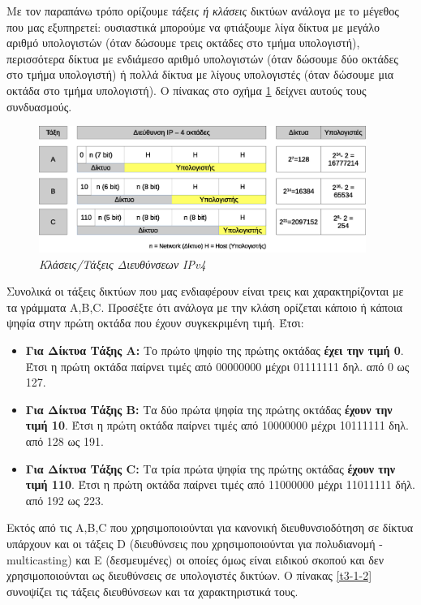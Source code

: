 Με τον παραπάνω τρόπο ορίζουμε \emph{τάξεις ή κλάσεις} δικτύων ανάλογα με το μέγεθος που μας εξυπηρετεί: ουσιαστικά μπορούμε να φτιάξουμε λίγα δίκτυα με μεγάλο αριθμό υπολογιστών (όταν δώσουμε τρεις οκτάδες στο τμήμα υπολογιστή), περισσότερα δίκτυα με ενδιάμεσο αριθμό υπολογιστών (όταν δώσουμε δύο οκτάδες στο τμήμα υπολογιστή) ή πολλά δίκτυα με λίγους υπολογιστές (όταν δώσουμε μια οκτάδα στο τμήμα υπολογιστή). Ο πίνακας στο σχήμα \ref{3-2} δείχνει αυτούς τους συνδυασμούς.

\begin{figure}[!ht]
  \centering
  \includegraphics[width=0.95\textwidth]{images/chapter3/3-3}
  \caption {\textsl{Κλάσεις/Τάξεις Διευθύνσεων IPv4}}
  \label{3-2}
\end{figure}

Συνολικά οι τάξεις δικτύων που μας ενδιαφέρουν είναι τρεις και χαρακτηρίζονται με τα γράμματα A,B,C. Προσέξτε ότι ανάλογα με την κλάση ορίζεται κάποιο ή κάποια ψηφία στην πρώτη οκτάδα που έχουν συγκεκριμένη τιμή. Έτσι:

\begin{itemize}
\item \textbf{Για Δίκτυα Τάξης Α:} Το πρώτο ψηφίο της πρώτης οκτάδας \textbf{έχει την τιμή 0}. Έτσι η πρώτη οκτάδα παίρνει τιμές από 00000000 μέχρι 01111111 δηλ. από 0 ως 127.
\item \textbf{Για Δίκτυα Τάξης Β:} Τα δύο πρώτα ψηφία της πρώτης οκτάδας \textbf{έχουν την τιμή 10}. Έτσι η πρώτη οκτάδα παίρνει τιμές από 10000000 μέχρι 10111111 δηλ. από 128 ως 191.
\item \textbf{Για Δίκτυα Τάξης C:} Τα τρία πρώτα ψηφία της πρώτης οκτάδας \textbf{έχουν την τιμή 110}. Έτσι η πρώτη οκτάδα παίρνει τιμές από 11000000 μέχρι 11011111 δήλ. από 192 ως 223.
\end{itemize}

Εκτός από τις A,B,C που χρησιμοποιούνται για κανονική διευθυνσιοδότηση σε δίκτυα υπάρχουν και οι τάξεις D (διευθύνσεις που χρησιμοποιούνται για πολυδιανομή - multicasting) και Ε (δεσμευμένες) οι οποίες όμως είναι ειδικού σκοπού και δεν χρησιμοποιούνται ως διευθύνσεις σε υπολογιστές δικτύων.  Ο πίνακας \ref{t3-1-2} συνοψίζει τις τάξεις διευθύνσεων και τα χαρακτηριστικά τους.

